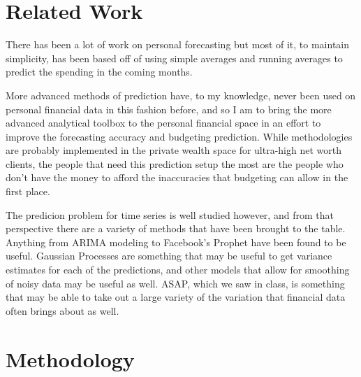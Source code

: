 \documentclass[11pt,a4paper]{article}
\begin{document}
\section{Related Work}

There has been a lot of work on personal forecasting but most of it, to maintain simplicity, has been based off of using simple averages and running averages to predict the spending in the coming months. 

More advanced methods of prediction have, to my knowledge, never been used on personal financial data in this fashion before, and so I am to bring the more advanced analytical toolbox to the personal financial space in an effort to improve the forecasting accuracy and budgeting prediction. While methodologies are probably implemented in the private wealth space for ultra-high net worth clients, the people that need this prediction setup the most are the people who don't have the money to afford the inaccuracies that budgeting can allow in the first place. 

The predicion problem for time series is well studied however, and from that perspective there are a variety of methods that have been brought to the table. Anything from ARIMA modeling to Facebook's Prophet have been found to be useful. Gaussian Processes are something that may be useful to get variance estimates for each of the predictions, and other models that allow for smoothing of noisy data may be useful as well. ASAP, which we saw in class, is something that may be able to take out a large variety of the variation that financial data often brings about as well. 








\section{Methodology}
\end{document}
